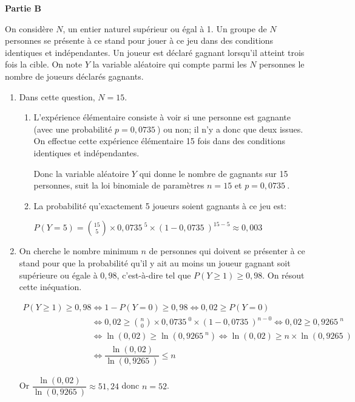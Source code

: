 \documentclass[10pt]{article}
\providecommand{\np}[2][]{{#2~#1}}
\providecommand{\ds}{\displaystyle}
\begin{document}
\medskip

\textbf{Partie B}

\medskip

On considère $N$, un entier naturel supérieur ou égal à 1.
Un groupe de $N$ personnes se présente à ce stand pour jouer à ce jeu dans des conditions identiques et indépendantes. 
Un joueur est déclaré gagnant lorsqu'il atteint trois fois la cible.
On note $Y$ la variable aléatoire qui compte parmi les $N$ personnes le nombre de joueurs déclarés gagnants.



\begin{enumerate}
\item Dans cette question, $N = 15$.
	\begin{enumerate}
		\item 
L'expérience élémentaire consiste à voir si une personne est gagnante (avec une probabilité $p=\np{0,0735}$) ou non; il n'y a donc que deux issues.
On effectue cette expérience élémentaire	15 fois dans des conditions identiques et indépendantes.

Donc la variable aléatoire $Y$ qui donne le nombre de gagnants sur 15 personnes, suit la loi binomiale de paramètres $n=15$ et $p=\np{0,0735}$.
		
		
		\item La probabilité qu'exactement 5 joueurs soient gagnants à ce jeu est:
		
$P(Y=5)=\ds\binom{15}{5}\times \np{0,0735}^{5} \times \left (1-\np{0,0735}\right )^{15-5} \approx 0,003$
	\end{enumerate}
	
\item On cherche le nombre minimum $n$ de personnes qui doivent se présenter à ce stand pour que la probabilité qu'il y ait au moins un joueur gagnant soit supérieure ou égale à $0,98$, c'est-à-dire tel que $P(Y\geqslant 1)\geqslant 0,98$.
On résout cette inéquation.

$\begin{gathered}P(Y\geqslant 1) \geqslant 0,98
\iff
1-P(Y=0) \geqslant 0,98
\iff
0,02\geqslant P(Y=0)\\
\phantom{P(Y\geqslant 1) \geqslant 0,98}
\iff
0,02 \geqslant \ds\binom{n}{0}\times \np{0,0735}^{0} \times \left (1-\np{0,0735}\right )^{n-0}
\iff
0,02 \geqslant \np{0,9265}^n \\
\phantom{P(Y\geqslant 1) \geqslant 0,98}
\iff
\ln\left (0,02\right ) \geqslant \ln\left (\np{0,9265}^n\right )
\iff
\ln\left (0,02\right ) \geqslant n\times \ln\left (\np{0,9265}\right )\\
\phantom{P(Y\geqslant 1) \geqslant 0,98}
\iff
\dfrac{\ln\left (0,02\right )}{\ln\left (\np{0,9265}\right )} \leqslant n\end{gathered}$

Or $\dfrac{\ln\left (0,02\right )}{\ln\left (\np{0,9265}\right )}\approx 51,24$ donc $n=52$.

\end{enumerate}

\bigskip
\end{document}
